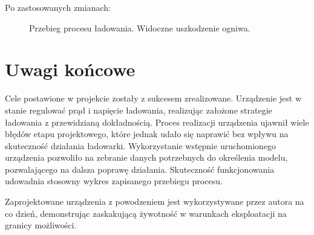 \documentclass[polish,engineer]{polsl-msth}
\begin{document}
Po zastosowanych zmianach:
\begin{figure}[hbtp]
     \caption{Przebieg procesu ładowania. Widoczne uszkodzenie ogniwa. \label{img:PrettyChargeWithCellFailure}}
\end{figure}

\chapter{Uwagi końcowe}
Cele postawione w projekcie zostały z sukcesem zrealizowane. Urządzenie jest w stanie regulować prąd i napięcie ładowania, realizując założone strategie ładowania z przewidzianą dokładnością. Proces realizacji urządzenia ujawnił wiele błędów etapu projektowego, które jednak udało się naprawić bez wpływu na skuteczność działania ładowarki. Wykorzystanie wstępnie uruchomionego urządzenia pozwoliło na zebranie danych potrzebnych do określenia modelu, pozwalającego na dalsza poprawę działania. Skuteczność funkcjonowania udowadnia stosowny wykres zapisanego przebiegu procesu.

Zaprojektowane urządzenia z powodzeniem jest wykorzystywane przez autora na co dzień, demonstrując zaskakującą żywotność w warunkach eksploatacji na granicy możliwości.


 

\end{document}
